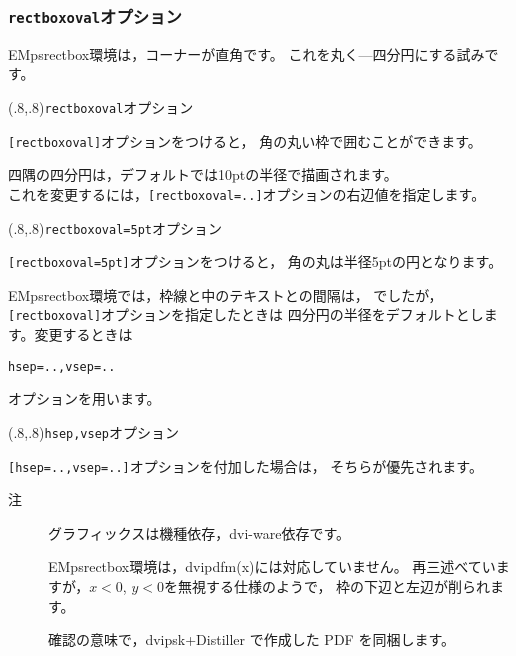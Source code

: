 \documentclass[a4j]{jarticle}
\begin{document}
\subsubsection{\texttt{rectboxoval}オプション}
\textsf{EMpsrectbox}環境は，コーナーが直角です。
これを丸く---四分円にする試みです。

\begin{showEx}(.8,.8){\texttt{rectboxoval}オプション}
\begin{EMpsrectbox}[rectboxoval]
\texttt{[rectboxoval]}オプションをつけると，
角の丸い枠で囲むことができます。
\end{EMpsrectbox}
\end{showEx}

四隅の四分円は，デフォルトでは10ptの半径で描画されます。\\
これを変更するには，\verb+[rectboxoval=..]+オプションの右辺値を指定します。

\begin{showEx}(.8,.8){\texttt{rectboxoval=5pt}オプション}
\begin{EMpsrectbox}[rectboxoval=5pt]
\texttt{[rectboxoval=5pt]}オプションをつけると，
角の丸は半径5ptの円となります。
\end{EMpsrectbox}
\end{showEx}

\textsf{EMpsrectbox}環境では，枠線と中のテキストとの間隔は，
でしたが，\verb+[rectboxoval]+オプションを指定したときは
四分円の半径をデフォルトとします。変更するときは
\begin{jquote}
\begin{verbatim}
hsep=..,vsep=..
\end{verbatim}
\end{jquote}
オプションを用います。

\begin{showEx}(.8,.8){\texttt{hsep,vsep}オプション}
\begin{EMpsrectbox}[rectboxoval,hsep=2zw,vsep=.5zh]
\verb+[hsep=..,vsep=..]+オプションを付加した場合は，
そちらが優先されます。
\end{EMpsrectbox}
\end{showEx}

\begin{description}
\item[注　]グラフィックスは機種依存，dvi-ware依存です。

  \textsf{EMpsrectbox}環境は，dvipdfm(x)には対応していません。
  再三述べていますが，$x<0$, $y<0$を無視する仕様のようで，
  枠の下辺と左辺が削られます。
  
  確認の意味で，dvipsk+Distiller で作成した PDF を同梱します。
\end{description}
\end{document}
